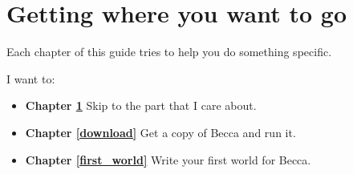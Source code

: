 \chapter{Getting where you want to go}
\label{navigate}

Each chapter of this guide tries to help you do something specific.

I want to:

\begin{itemize}

	\item{{\bf Chapter \ref{navigate}}  Skip to the part that I care about.}
	\item{{\bf Chapter \ref{download}} Get a copy of Becca and run it.}  
	\item{{\bf Chapter \ref{first_world}} Write your first world for Becca.}  
	
\end{itemize}
